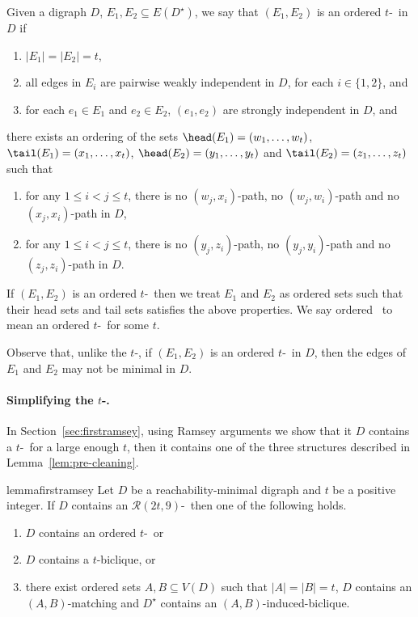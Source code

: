 \begin{definition}
Given a 
digraph $D$, $E_1, E_2 \subseteq E(D^{\star})$, we say that $(E_1,E_2)$ is an ordered $t$-\toughpair\  in $D$ if 
\begin{enumerate}
\item $|E_1| = |E_2|=t$,
\item all edges in $E_i$ are pairwise weakly independent in $D$, for each $i \in \{1,2\}$, and
\item for each $e_1 \in E_1$ and $e_2 \in E_2$, $(e_1,e_2)$ are strongly independent in $D$, and
\end{enumerate}
there exists an ordering of the sets $\head(E_1) = (w_1, \ldots, w_t)$, $\tail(E_1)=(x_1, \ldots, x_t)$, $\head(E_2)=(y_1, \ldots, y_t)$ and $\tail(E_2)=(z_1, \ldots, z_t)$ such that
\begin{enumerate}
\item for any $1\leq i < j \leq t$, there is no $(w_j,x_i)$-path, no $(w_j,w_i)$-path and no $(x_j,x_i)$-path in $D$,
\item for any $1\leq i < j \leq t$, there is no $(y_j,z_i)$-path, no $(y_j,y_i)$-path and no $(z_j,z_i)$-path in $D$.
\end{enumerate}
If $(E_1,E_2)$ is an ordered $t$-\toughpair\ then we treat $E_1$ and $E_2$ as ordered sets such that their head sets and tail sets satisfies the above properties. We say ordered \toughpair\ to mean an ordered $t$-\toughpair\ for some $t$.
\end{definition}

Observe that, unlike the $t$-\toughpair, if $(E_1,E_2)$ is an ordered $t$-\toughpair\ in $D$, then the edges of $E_1$ and $E_2$ may not be minimal in $D$.

\paragraph*{Simplifying the $t$-\toughpair.}
In Section~\ref{sec:firstramsey}, using Ramsey arguments we show that it $D$ contains a $t$-\toughpair\ for a large enough $t$, then it contains one of the three structures described in Lemma~\ref{lem:pre-cleaning}.

\begin{restatable}{lemma}{firstramsey}\label{lem:pre-cleaning}
Let $D$ be a reachability-minimal digraph and $t$ be a positive integer. 
If $D$ contains an $\mathcal{R}(2t,9)$-\toughpair\
then one of the following holds.
\begin{enumerate}
\item $D$ contains an ordered $t$-\toughpair\, or
\item $D$ contains a $t$-biclique, or
\item there exist ordered sets $A,B \subseteq V(D)$ such that $|A|=|B|=t$, $D$ contains an $(A,B)$-matching and $D^{\star}$ contains an $(A,B)$-induced-biclique. 
\end{enumerate}
\end{restatable}

